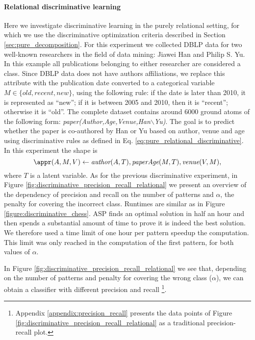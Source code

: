 \paragraph{Relational discriminative learning}
Here we investigate discriminative learning in the purely relational setting, for which we use the discriminative optimization criteria described in Section \ref{sec:pure_decomposition}. For this experiment we collected DBLP data for two well-known researchers in the field of data mining: Jiawei Han and Philip S. Yu. In this example all publications belonging to either researcher are considered a class. Since DBLP data does not have authors affiliations, we replace this attribute with the publication date converted to a categorical variable $M \in \{ \textit{old}, \textit{recent}, \textit{new} \}$, using the following rule: if the date is later than 2010, it is represented as ``new''; if it is between 2005 and 2010, then it is ``recent''; otherwise it is ``old''. The complete dataset contains around 6000 ground atoms of the following form: \textit{paper(Author,Age,Venue,Han$\backslash$Yu)}. The goal is to predict whether the paper is co-authored by Han or Yu based on author, venue and age using discriminative rules as defined in Eq. \ref{eq:pure_relational_discriminative}. In this experiment the shape is
\begin{equation*}
  \appr(A,M,V) \leftarrow \textit{author}(A,T), \textit{paperAge}(M,T), \textit{venue}(V,M),
\end{equation*}
where $T$ is a latent variable. As for the previous discriminative experiment, in Figure \ref{fig:discriminative_precision_recall_relational} we present an overview of the dependency of precision and recall on the number of patterns and $\alpha$, the penalty for covering the incorrect class. Runtimes are similar as in Figure \ref{figure:discriminative_chess}. ASP finds an optimal solution in half an hour and then spends a substantial amount of time to prove it is indeed the best solution. We therefore used a time limit of one hour per pattern speedup the computation. This limit was only reached in the computation of the first pattern, for both values of $\alpha$.

In Figure \ref{fig:discriminative_precision_recall_relational} we see that, depending on the number of patterns and penalty for covering the wrong class ($\alpha$), we can obtain a classifier with different precision and recall%
\footnote{\changesb Appendix \ref{appendix:precision_recall} presents the data points of Figure \ref{fig:discriminative_precision_recall_relational} as a traditional precision-recall plot.\changese}.


